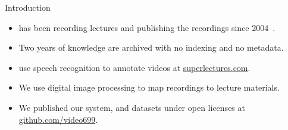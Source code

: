 \begin{frame}{Introduction }
\begin{itemize}
\item<1-7>   has been \alert{recording lectures} and publishing the
  recordings since 2004~\cite{hladkaliska03lectures}.
\item<3-7> Two years of knowledge are archived with \alert{no indexing} and
  \alert{no metadata}.
\item<4-7>  use \alert{speech recognition} to annotate videos at
  \href{https://superlectures.com/}{superlectures.com}.
\item<5-7> We use \alert{digital image processing} to map recordings to lecture
  materials.
\item<7> We published our system, and datasets under \alert{open licenses}
  at \href{https://github.com/video699}{github.com/video699}.
\end{itemize}


\end{frame}
